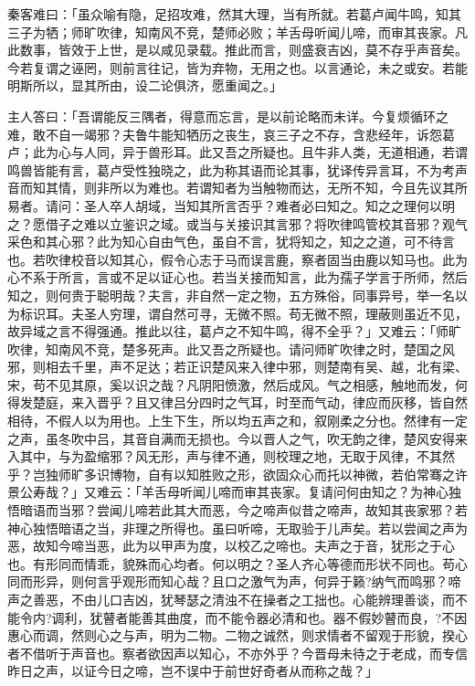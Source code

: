 \documentclass[UTF8,titlepage,oneside]{ctexbook}
\begin{document}
秦客难曰：「虽众喻有隐，足招攻难，然其大理，当有所就。若葛卢闻牛鸣，知其三子为牺；师旷吹律，知南风不竞，楚师必败；羊舌母听闻儿啼，而审其丧家。凡此数事，皆效于上世，是以咸见录载。推此而言，则盛衰吉凶，莫不存乎声音矣。今若复谓之诬罔，则前言往记，皆为弃物，无用之也。以言通论，未之或安。若能明斯所以，显其所由，设二论俱济，愿重闻之。」


主人答曰：「吾谓能反三隅者，得意而忘言，是以前论略而未详。今复烦循环之难，敢不自一竭邪？夫鲁牛能知牺历之丧生，哀三子之不存，含悲经年，诉怨葛卢；此为心与人同，异于兽形耳。此又吾之所疑也。且牛非人类，无道相通，若谓鸣兽皆能有言，葛卢受性独晓之，此为称其语而论其事，犹译传异言耳，不为考声音而知其情，则非所以为难也。若谓知者为当触物而达，无所不知，今且先议其所易者。请问：圣人卒人胡域，当知其所言否乎？难者必曰知之。知之之理何以明之？愿借子之难以立鉴识之域。或当与关接识其言邪？将吹律鸣管校其音邪？观气采色和其心邪？此为知心自由气色，虽自不言，犹将知之，知之之道，可不待言也。若吹律校音以知其心，假令心志于马而误言鹿，察者固当由鹿以知马也。此为心不系于所言，言或不足以证心也。若当关接而知言，此为孺子学言于所师，然后知之，则何贵于聪明哉？夫言，非自然一定之物，五方殊俗，同事异号，举一名以为标识耳。夫圣人穷理，谓自然可寻，无微不照。苟无微不照，理蔽则虽近不见，故异域之言不得强通。推此以往，葛卢之不知牛鸣，得不全乎？」又难云：「师旷吹律，知南风不竞，楚多死声。此又吾之所疑也。请问师旷吹律之时，楚国之风邪，则相去千里，声不足达；若正识楚风来入律中邪，则楚南有吴、越，北有梁、宋，苟不见其原，奚以识之哉？凡阴阳愤激，然后成风。气之相感，触地而发，何得发楚庭，来入晋乎？且又律吕分四时之气耳，时至而气动，律应而灰移，皆自然相待，不假人以为用也。上生下生，所以均五声之和，叙刚柔之分也。然律有一定之声，虽冬吹中吕，其音自满而无损也。今以晋人之气，吹无韵之律，楚风安得来入其中，与为盈缩邪？风无形，声与律不通，则校理之地，无取于风律，不其然乎？岂独师旷多识博物，自有以知胜败之形，欲固众心而托以神微，若伯常骞之许景公寿哉？」又难云：「羊舌母听闻儿啼而审其丧家。复请问何由知之？为神心独悟暗语而当邪？尝闻儿啼若此其大而恶，今之啼声似昔之啼声，故知其丧家邪？若神心独悟暗语之当，非理之所得也。虽曰听啼，无取验于儿声矣。若以尝闻之声为恶，故知今啼当恶，此为以甲声为度，以校乙之啼也。夫声之于音，犹形之于心也。有形同而情乖，貌殊而心均者。何以明之？圣人齐心等德而形状不同也。苟心同而形异，则何言乎观形而知心哉？且口之激气为声，何异于籁?纳气而鸣邪？啼声之善恶，不由儿口吉凶，犹琴瑟之清浊不在操者之工拙也。心能辨理善谈，而不能令内?调利，犹瞽者能善其曲度，而不能令器必清和也。器不假妙瞽而良，?不因惠心而调，然则心之与声，明为二物。二物之诚然，则求情者不留观于形貌，揆心者不借听于声音也。察者欲因声以知心，不亦外乎？今晋母未待之于老成，而专信昨日之声，以证今日之啼，岂不误中于前世好奇者从而称之哉？」
\end{document}

